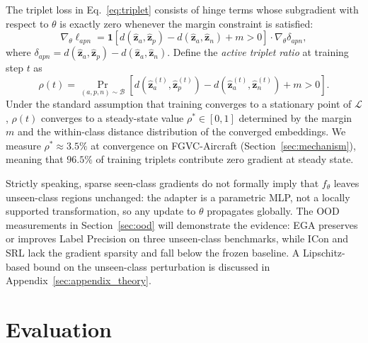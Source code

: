 \documentclass{article}
\begin{document}

The triplet loss in Eq.~\eqref{eq:triplet} consists of hinge terms whose
subgradient with respect to $\theta$ is exactly zero whenever the margin
constraint is satisfied:
\begin{equation}
	\nabla_\theta \ell_{apn} =
	\mathbf{1}\!\left[d(\hat{\mathbf{z}}_a, \hat{\mathbf{z}}_p) -
		d(\hat{\mathbf{z}}_a, \hat{\mathbf{z}}_n) + m > 0\right]
	\cdot \nabla_\theta \delta_{apn},
	\label{eq:hinge_grad}
\end{equation}
where $\delta_{apn} = d(\hat{\mathbf{z}}_a, \hat{\mathbf{z}}_p) -
	d(\hat{\mathbf{z}}_a, \hat{\mathbf{z}}_n)$. Define the \emph{active
	triplet ratio} at training step $t$ as
\begin{equation}
	\rho(t) = \Pr_{(a,p,n)\sim\mathcal{B}}\!\left[
	d(\hat{\mathbf{z}}_a^{(t)}, \hat{\mathbf{z}}_p^{(t)}) -
	d(\hat{\mathbf{z}}_a^{(t)}, \hat{\mathbf{z}}_n^{(t)}) + m > 0
	\right].
	\label{eq:active_ratio}
\end{equation}
Under the standard assumption that training converges to a stationary point of $\mathcal{L}$, $\rho(t)$ converges to a steady-state value $\rho^* \in [0, 1]$ determined by the margin $m$ and the within-class distance distribution of the converged embeddings.
We measure $\rho^* \approx 3.5\%$ at convergence on FGVC-Aircraft (Section~\ref{sec:mechanism}), meaning that $96.5\%$ of training triplets contribute zero gradient at steady state.

Strictly speaking, sparse seen-class gradients do not formally imply that $f_\theta$ leaves unseen-class regions unchanged: the adapter is a parametric MLP, not a locally supported transformation, so any update to $\theta$ propagates globally.
The OOD measurements in Section~\ref{sec:ood} will demonstrate the evidence: EGA preserves or improves Label Precision on three unseen-class benchmarks, while ICon and SRL lack the gradient sparsity and fall below the frozen baseline.
A Lipschitz-based bound on the unseen-class perturbation is discussed in Appendix~\ref{sec:appendix_theory}.

\section{Evaluation}
\label{sec:eval}
\end{document}
